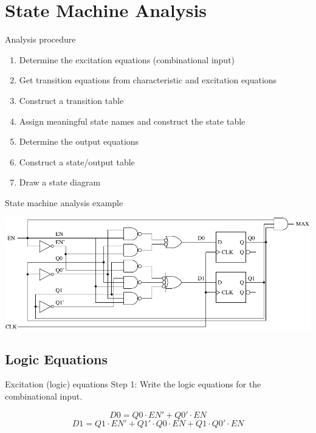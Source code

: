 \section{State Machine Analysis}

\begin{frame}{Analysis procedure}
  \begin{enumerate}
    \item Determine the excitation equations (combinational input)
    \item Get transition equations from characteristic and excitation equations
    \item Construct a transition table
    \item Assign meaningful state names and construct the state table
    \item Determine the output equations
    \item Construct a state/output table
    \item Draw a state diagram
  \end{enumerate}
\end{frame}

\begin{frame}{State machine analysis example}
  \begin{center}
    \includegraphics[scale=0.7]{BinaryCounter}
  \end{center}
\end{frame}

\subsection{Logic Equations}

\begin{frame}[t]{Excitation (logic) equations}
  Step 1: Write the logic equations for the combinational input.
\end{frame}

$$D0 = Q0 \cdot EN' + Q0' \cdot EN$$
$$D1 = Q1 \cdot EN' + Q1' \cdot Q0 \cdot EN + Q1 \cdot Q0' \cdot EN$$

